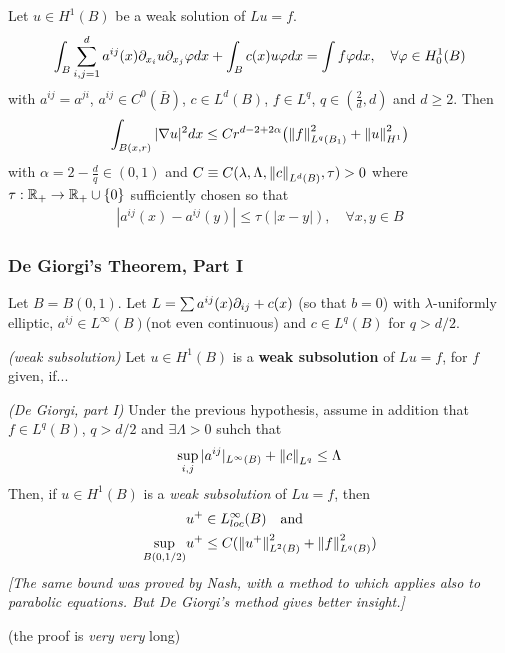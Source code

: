 \documentclass[10pt,a4paper]{article}
\begin{document}
\thm Let $u\in H^1(B)$ be a weak solution of $Lu=f$.
\begin{align*}
\int_{B} \sum_{i,j=1}^d a^{ij}(x) \partial_{x_i} u \partial_{x_j} \varphi dx + \int_B c(x) u\varphi dx =\int f\varphi dx, \quad \forall \varphi \in H_0^1 (B)
\end{align*}
with $a^{ij} = a^{ji}$, $a^{ij} \in C^0(\bar{B})$, $c\in L^d (B)$, $f\in L^q$, $q\in (\frac{2}{d}, d)$ and $d\geq 2$. Then
\begin{align*}
\int_{B(x,r)} |\nabla u|^2 dx \leq Cr^{d-2 + 2\alpha}\big( \snorms{f}{L^q(B_1)}^2 + \snorms{u}{H^1}^2 \big)
\end{align*}
with $\alpha = 2- \frac{d}{q} \in (0,1)$ and $C \equiv C(\lambda, \Lambda, \snorms{c}{L^d(B)}, \tau) >0$ where $\tau :\mathbb{R}_+ \rightarrow \mathbb{R}_+ \cup \{0\}$ sufficiently chosen so that
\begin{align*}
|a^{ij}(x) - a^{ij}(y)| \leq \tau(|x-y|), \quad \forall x,y\in B
\end{align*} 
\s

\subsubsection*{De Giorgi's Theorem, Part I}

Let $B= B(0,1)$. Let $L = \sum a^{ij}(x) \partial_{ij} + c(x)$ (so that $b=0$) with $\lambda$-uniformly elliptic, $a^{ij} \in L^{\infty}(B)$(not even continuous) and $c\in L^q(B)$ for $q> d/2$.
\s

 \emph{(weak subsolution)} Let $u\in H^1(B)$ is a \textbf{weak subsolution} of $Lu =f$, for $f$ given, if...
\s

\thm \emph{(De Giorgi, part I)} Under the previous hypothesis, assume in addition that $f\in L^q(B)$, $q> d/2$ and $\exists \Lambda >0$ suhch that
\begin{align*}
\sup_{i,j} |a^{ij}|_{L^{\infty}(B)} + \snorms{c}{L^q} \leq \Lambda
\end{align*}
Then, if $u \in H^1(B)$ is a \emph{weak subsolution} of $Lu =f$, then
\begin{align*}
& u^+ \in L^{\infty}_{loc}(B) \quad \text{and}\\
\sup_{B(0, 1/2)} & u^+ \leq C(\snorms{u^+}{L^2(B)}^2 + \snorms{f}{L^q(B)}^2)
\end{align*}
\emph{[The same bound was proved by Nash, with a method to which applies also to parabolic equations. But De Giorgi's method gives better insight.]} 

(the proof is \emph{very very} long)
\end{document}
